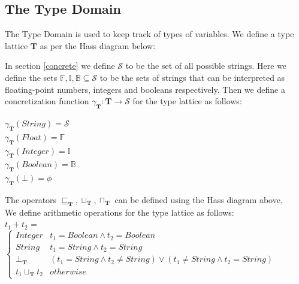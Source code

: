 \documentclass[10pt]{report}
\begin{document}
\subsection{The Type Domain} \label{types}

The Type Domain is used to keep track of types of variables. We define a type lattice $ \mathbf{T} $ as per the Hass diagram below: \\
\begin{center}
\end{center}

In section \ref{concrete} we define $ \mathcal{S} $ to be the set of all possible strings. Here we define the sets $ \mathbb{F}, \mathbb{I}, \mathbb{B} \subseteq \mathcal{S} $ to be the sets of strings that can be interpreted as floating-point numbers, integers and booleans respectively. Then we define a concretization function $ \gamma_{\mathbf{T}}: \mathbf{T} \longrightarrow \mathcal{S} $ for the type lattice as follows: 
\begin{center}
 $ \gamma_{\mathbf{T}}(String) = \mathcal{S} $ \\
 $ \gamma_{\mathbf{T}}(Float) = \mathbb{F} $ \\
  $ \gamma_{\mathbf{T}}(Integer) = \mathbb{I} $ \\
   $ \gamma_{\mathbf{T}}(Boolean) = \mathbb{B} $ \\
    $ \gamma_{\mathbf{T}}(\bot) = \phi $

\end{center}
The operators $ \sqsubseteq_{\mathbf{T}}, \sqcup_{\mathbf{T}}, \sqcap_{\mathbf{T}} $ can be defined using the Hass diagram above. \\

We define arithmetic operations for the type lattice as follows:\\
\hspace*{15mm}$ t_{1} + t_{2}$ = $ \left\{
\begin{array}{ll}
Integer & t_{1} = Boolean \wedge t_{2} = Boolean \\
String & t_{1} = String \wedge t_{2} = String \\
\bot_{\mathbf{T}} & (t_{1} = String \wedge t_{2} \neq String) \vee (t_{1} \neq String \wedge t_{2} = String) \\
t_{1} \sqcup_{\mathbf{T}} t_{2} & otherwise
\end{array} 
\right. $ \\ \\
\end{document}
